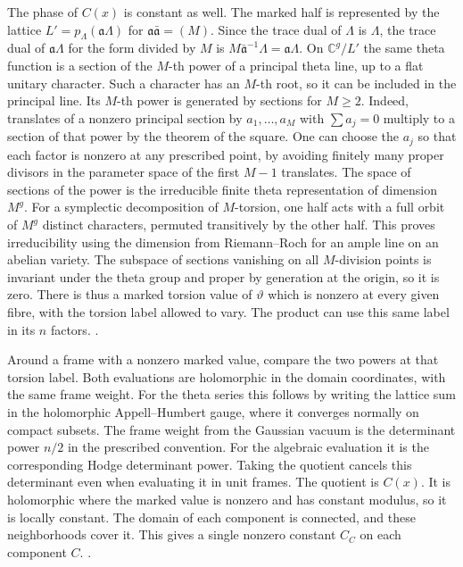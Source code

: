 The phase of \(C(x)\) is constant as well. The marked
half is represented by the lattice \(L'=p_\Lambda(\mathfrak a\Lambda)\)
for \(\mathfrak a\bar{\mathfrak a}=(M)\). Since the trace
dual of \(\Lambda\) is \(\Lambda\), the trace dual of
\(\mathfrak a\Lambda\) for the form divided by \(M\) is
\(M\bar{\mathfrak a}^{-1}\Lambda=\mathfrak a\Lambda\).
On \(\mathbb C^g/L'\) the same theta function is a
section of the \(M\)-th power of a principal theta
line, up to a flat unitary character. Such a character
has an \(M\)-th root, so it can be included in the
principal line. Its \(M\)-th power is generated by
sections for \(M\ge2\). Indeed, translates of a
nonzero principal section by \(a_1,\ldots,a_M\) with
\(\sum a_j=0\) multiply to a section of that power by
the theorem of the square. One can choose the \(a_j\)
so that each factor is nonzero at any prescribed
point, by avoiding finitely many proper divisors in
the parameter space of the first \(M-1\) translates.
The space of sections of the power is the irreducible
finite theta representation of dimension \(M^g\).
For a symplectic decomposition of \(M\)-torsion, one
half acts with a full orbit of \(M^g\) distinct
characters, permuted transitively by the other half.
This proves irreducibility using the dimension from
Riemann--Roch for an ample line on an abelian variety.
The subspace of sections vanishing on all
\(M\)-division points is invariant under the theta
group and proper by generation at the origin,
so it is zero. There is thus a marked torsion value
of \(\vartheta\) which is nonzero at every given
fibre, with the torsion label allowed to vary.
The product can use this same label in its \(n\)
factors.
\cite[\S1]{mumford-theta-isogeny}
.

Around a frame with a nonzero marked value, compare
the two powers at that torsion label. Both evaluations
are holomorphic in the domain coordinates, with the
same frame weight. For the theta series this follows
by writing the lattice sum in the holomorphic
Appell--Humbert gauge, where it converges normally on
compact subsets. The frame weight from the Gaussian
vacuum is the determinant power \(n/2\) in the
prescribed convention. For the algebraic evaluation
it is the corresponding Hodge determinant power.
Taking the quotient cancels this determinant even
when evaluating it in unit frames. The quotient is
\(C(x)\). It is holomorphic where the marked value
is nonzero and has constant modulus, so it is locally
constant. The domain of each component is connected,
and these neighborhoods cover it. This gives a single
nonzero constant \(C_C\) on each component \(C\).
.

